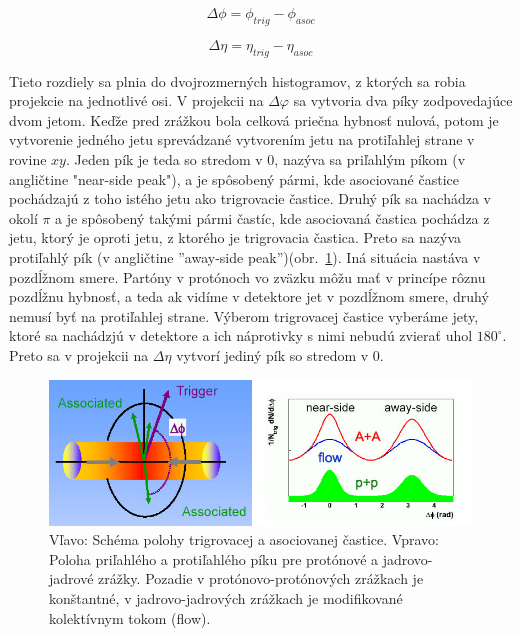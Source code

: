 \documentclass[thesismargins, thesislinespacing]{rnthesis}
\begin{document}
\begin{equation}
\Delta \phi = \phi_{trig} - \phi_{asoc}
\end{equation}

\begin{equation}
\Delta \eta = \eta_{trig} - \eta_{asoc}
\end{equation}

Tieto rozdiely sa plnia do dvojrozmerných histogramov, z ktorých sa robia projekcie na jednotlivé osi. V projekcii na $\Delta \varphi$ sa vytvoria dva píky zodpovedajúce dvom jetom. Keďže pred zrážkou bola celková priečna hybnosť nulová, potom je vytvorenie jedného jetu sprevádzané vytvorením jetu na protiľahlej strane v rovine $xy$. Jeden pík je teda so stredom v 0, nazýva sa priľahlým píkom (v angličtine "near-side peak"), a je spôsobený pármi, kde asociované častice pochádzajú z toho istého jetu ako trigrovacie častice. Druhý pík sa nachádza v okolí $\pi$ a je spôsobený takými pármi častíc, kde asociovaná častica pochádza z jetu, ktorý je oproti jetu, z ktorého je trigrovacia častica. Preto sa nazýva protiľahlý pík (v angličtine ''away-side peak'')(obr.~\ref{kor}). Iná situácia nastáva v pozdĺžnom smere. Partóny v protónoch vo zväzku môžu mať v princípe rôznu pozdĺžnu hybnosť, a teda ak vidíme v detektore jet v pozdĺžnom smere, druhý nemusí byť na protiľahlej strane. Výberom trigrovacej častice vyberáme jety, ktoré sa nachádzjú v detektore a ich náprotivky s nimi nebudú zvierať uhol $180^\circ$. Preto sa v projekcii na $\Delta \eta$ vytvorí jediný pík so stredom v 0.

\begin{figure}[hbtp!]
	\begin{center}
		\includegraphics[width=\textwidth]{./Obrazky_praca/dijetcorrelations.png}
		\caption{Vľavo: Schéma polohy trigrovacej a asociovanej častice. Vpravo: Poloha priľahlého a protiľahlého píku pre protónové a jadrovo-jadrové zrážky. Pozadie v protónovo-protónových zrážkach je konštantné, v jadrovo-jadrových zrážkach je \-mo\-di\-fi\-ko\-va\-né kolektívnym tokom (flow).}
		\label{kor}
	\end{center}
\end{figure}
\end{document}

